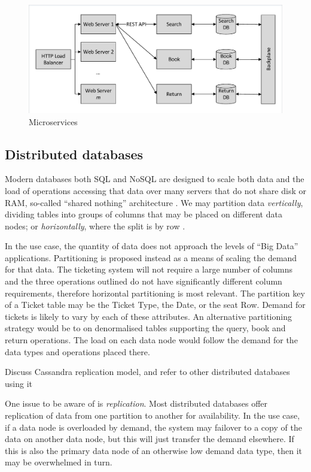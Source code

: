 \begin{figure}
\caption{Microservices}
\centering
\includegraphics[trim = 5 5 5 5, clip, width=\textwidth]{img/microservices}
\end{figure}

%
%

\subsection{Distributed databases}\label{sec:distributed-databases}
Modern databases both SQL and NoSQL are designed to scale both data and the load of operations accessing that data over many servers that do not share disk or RAM, so-called ``shared nothing'' architecture \cite{RN67}.  We may partition data {\itshape vertically}, dividing tables into groups of columns that may be placed on different data nodes; or {\itshape horizontally}, where the split is by row \cite{RN68}. 

In the use case, the quantity of data does not approach the levels of ``Big Data'' applications.  Partitioning is proposed instead as a means of scaling the demand for that data.  The ticketing system will not require a large number of columns and the three operations outlined do not have significantly different column requirements, therefore horizontal partitioning is most relevant.  The partition key of a Ticket table may be the Ticket Type, the Date, or the seat Row.  Demand for tickets is likely to vary by each of these attributes.  An alternative partitioning strategy would be to on denormalised tables supporting the query, book and return operations.  The load on each data node would follow the demand for the data types and operations placed there.

\begin{shaded}
Discuss Cassandra replication model, and refer to other distributed databases using it

One issue to be aware of is {\itshape replication}.   Most distributed databases offer replication of data from one partition to another for availability.  In the use case, if a data node is overloaded by demand, the system may failover to a copy of the data on another data node, but this will just transfer the demand elsewhere.  If this is also the primary data node of an otherwise low demand data type, then it may be overwhelmed in turn.
\end{shaded}

